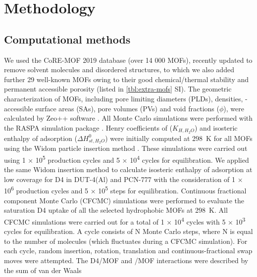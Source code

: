 \section{Methodology}\label{methodology}

\subsection{Computational methods}\label{methodology-computational}

We used the CoRE-MOF 2019 database \citep{chungAdvancesUpdatesAnalytics2019}
(over 14 000 MOFs), recently updated to remove solvent molecules and disordered
structures, to which we also added further 29 well-known MOFs owing to their
good chemical/thermal stability and permanent accessible porosity (listed in
\cref{tbl:extra-mofs} SI). The geometric characterization of MOFs, including
pore limiting diameters (PLDs), densities, -accessible surface areas
(SAs), pore volumes (PVs) and void fractions (\(\phi\)), were calculated by
Zeo++ software \citep{willemsAlgorithmsToolsHighthroughput2012}. All Monte Carlo
simulations were performed with the RASPA simulation package
\citep{dubbeldamRASPAMolecularSimulation2016}. Henry coefficients of 
(\(K_{H,H_{2}O}\)) and isosteric enthalpy of adsorption (\(\Delta
H_{st,H_{2}O}^{0}\)) were initially computed at \SI{298}{\kelvin} for all MOFs
using the Widom particle insertion method
\citep{frenkelUnderstandingMolecularSimulation2002}. These simulations were
carried out using 1 × 10\textsuperscript{5} production cycles and 5 ×
10\textsuperscript{4} cycles for equilibration. We applied the same Widom
insertion method to calculate isosteric enthalpy of adsorption at low coverage
for D4 in DUT-4(Al) and PCN-777 with the consideration of 1 × 10\textsuperscript{6}
production cycles and 5 × 10\textsuperscript{5} steps for equilibration.
Continuous fractional component Monte Carlo (CFCMC) simulations
\citep{rahbariRecentAdvancesContinuous2020} were performed to evaluate the
saturation D4 uptake of all the selected hydrophobic MOFs at \SI{298}{\kelvin}.
All CFCMC simulations were carried out for a total of 1 × 10\textsuperscript{4}
cycles with 5 × 10\textsuperscript{3} cycles for equilibration. A cycle consists
of N Monte Carlo steps, where N is equal to the number of molecules (which
fluctuates during a CFCMC simulation). For each cycle, random insertion,
rotation, translation and continuous-fractional swap moves were attempted. The
D4/MOF and /MOF interactions were described by the sum of van der Waals
